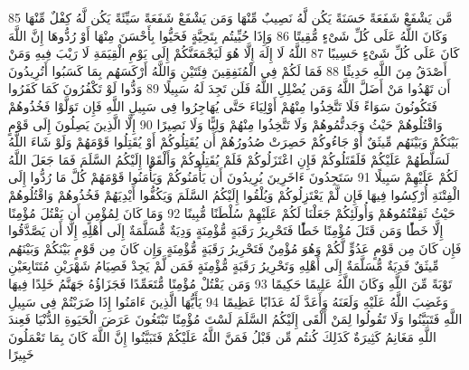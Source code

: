 {\tiny\colorbox{cl_aya}{85}} مَّن يَشْفَعْ شَفَعَةً حَسَنَةً يَكُن لَّهُ نَصِيبٌ مِّنْهَا وَمَن يَشْفَعْ شَفَعَةً سَيِّئَةً يَكُن لَّهُ كِفْلٌ مِّنْهَا وَكَانَ اللَّهُ عَلَى كُلِّ شَىْءٍ مُّقِيتًا
{\tiny\colorbox{cl_aya}{86}} وَإِذَا حُيِّيتُم بِتَحِيَّةٍ فَحَيُّوا بِأَحْسَنَ مِنْهَا أَوْ رُدُّوهَا إِنَّ اللَّهَ كَانَ عَلَى كُلِّ شَىْءٍ حَسِيبًا
{\tiny\colorbox{cl_aya}{87}} اللَّهُ لَا إِلَهَ إِلَّا هُوَ لَيَجْمَعَنَّكُمْ إِلَى يَوْمِ الْقِيَمَةِ لَا رَيْبَ فِيهِ وَمَنْ أَصْدَقُ مِنَ اللَّهِ حَدِيثًا
{\tiny\colorbox{cl_aya}{88}} فَمَا لَكُمْ فِى الْمُنَفِقِينَ فِئَتَيْنِ وَاللَّهُ أَرْكَسَهُم بِمَا كَسَبُوا أَتُرِيدُونَ أَن تَهْدُوا مَنْ أَضَلَّ اللَّهُ وَمَن يُضْلِلِ اللَّهُ فَلَن تَجِدَ لَهُ سَبِيلًا
{\tiny\colorbox{cl_aya}{89}} وَدُّوا لَوْ تَكْفُرُونَ كَمَا كَفَرُوا فَتَكُونُونَ سَوَاءً فَلَا تَتَّخِذُوا مِنْهُمْ أَوْلِيَاءَ حَتَّى يُهَاجِرُوا فِى سَبِيلِ اللَّهِ فَإِن تَوَلَّوْا فَخُذُوهُمْ وَاقْتُلُوهُمْ حَيْثُ وَجَدتُّمُوهُمْ وَلَا تَتَّخِذُوا مِنْهُمْ وَلِيًّا وَلَا نَصِيرًا
{\tiny\colorbox{cl_aya}{90}} إِلَّا الَّذِينَ يَصِلُونَ إِلَى قَوْمٍ بَيْنَكُمْ وَبَيْنَهُم مِّيثَقٌ أَوْ جَاءُوكُمْ حَصِرَتْ صُدُورُهُمْ أَن يُقَتِلُوكُمْ أَوْ يُقَتِلُوا قَوْمَهُمْ وَلَوْ شَاءَ اللَّهُ لَسَلَّطَهُمْ عَلَيْكُمْ فَلَقَتَلُوكُمْ فَإِنِ اعْتَزَلُوكُمْ فَلَمْ يُقَتِلُوكُمْ وَأَلْقَوْا إِلَيْكُمُ السَّلَمَ فَمَا جَعَلَ اللَّهُ لَكُمْ عَلَيْهِمْ سَبِيلًا
{\tiny\colorbox{cl_aya}{91}} سَتَجِدُونَ ءَاخَرِينَ يُرِيدُونَ أَن يَأْمَنُوكُمْ وَيَأْمَنُوا قَوْمَهُمْ كُلَّ مَا رُدُّوا إِلَى الْفِتْنَةِ أُرْكِسُوا فِيهَا فَإِن لَّمْ يَعْتَزِلُوكُمْ وَيُلْقُوا إِلَيْكُمُ السَّلَمَ وَيَكُفُّوا أَيْدِيَهُمْ فَخُذُوهُمْ وَاقْتُلُوهُمْ حَيْثُ ثَقِفْتُمُوهُمْ وَأُولَئِكُمْ جَعَلْنَا لَكُمْ عَلَيْهِمْ سُلْطَنًا مُّبِينًا
{\tiny\colorbox{cl_aya}{92}} وَمَا كَانَ لِمُؤْمِنٍ أَن يَقْتُلَ مُؤْمِنًا إِلَّا خَطًَٔا وَمَن قَتَلَ مُؤْمِنًا خَطًَٔا فَتَحْرِيرُ رَقَبَةٍ مُّؤْمِنَةٍ وَدِيَةٌ مُّسَلَّمَةٌ إِلَى أَهْلِهِ إِلَّا أَن يَصَّدَّقُوا فَإِن كَانَ مِن قَوْمٍ عَدُوٍّ لَّكُمْ وَهُوَ مُؤْمِنٌ فَتَحْرِيرُ رَقَبَةٍ مُّؤْمِنَةٍ وَإِن كَانَ مِن قَوْمٍ بَيْنَكُمْ وَبَيْنَهُم مِّيثَقٌ فَدِيَةٌ مُّسَلَّمَةٌ إِلَى أَهْلِهِ وَتَحْرِيرُ رَقَبَةٍ مُّؤْمِنَةٍ فَمَن لَّمْ يَجِدْ فَصِيَامُ شَهْرَيْنِ مُتَتَابِعَيْنِ تَوْبَةً مِّنَ اللَّهِ وَكَانَ اللَّهُ عَلِيمًا حَكِيمًا
{\tiny\colorbox{cl_aya}{93}} وَمَن يَقْتُلْ مُؤْمِنًا مُّتَعَمِّدًا فَجَزَاؤُهُ جَهَنَّمُ خَلِدًا فِيهَا وَغَضِبَ اللَّهُ عَلَيْهِ وَلَعَنَهُ وَأَعَدَّ لَهُ عَذَابًا عَظِيمًا
{\tiny\colorbox{cl_aya}{94}} يَأَيُّهَا الَّذِينَ ءَامَنُوا إِذَا ضَرَبْتُمْ فِى سَبِيلِ اللَّهِ فَتَبَيَّنُوا وَلَا تَقُولُوا لِمَنْ أَلْقَى إِلَيْكُمُ السَّلَمَ لَسْتَ مُؤْمِنًا تَبْتَغُونَ عَرَضَ الْحَيَوةِ الدُّنْيَا فَعِندَ اللَّهِ مَغَانِمُ كَثِيرَةٌ كَذَلِكَ كُنتُم مِّن قَبْلُ فَمَنَّ اللَّهُ عَلَيْكُمْ فَتَبَيَّنُوا إِنَّ اللَّهَ كَانَ بِمَا تَعْمَلُونَ خَبِيرًا
